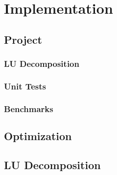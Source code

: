 \chapter{Implementation \TODO}
\section{Project \TODO}
\subsection{LU Decomposition \TODO}
\subsection{Unit Tests \TODO}
\subsection{Benchmarks \TODO}
\section{Optimization \TODO}
\section{LU Decomposition \TODO}